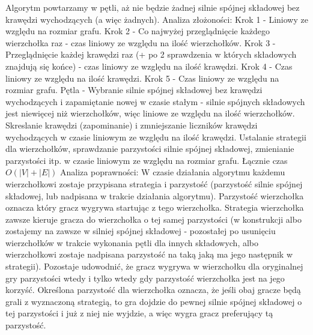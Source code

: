 \documentclass{article}
\begin{document}
Algorytm powtarzamy w pętli, aż nie będzie żadnej silnie spójnej składowej bez krawędzi wychodzących (a więc żadnych).\newline
\newline
Analiza złożoności:\newline
Krok 1 - Liniowy ze względu na rozmiar grafu.\newline
Krok 2 - Co najwyżej przeglądnięcie każdego wierzchołka raz - czas liniowy ze względu na ilość wierzchołków.\newline
Krok 3 - Przeglądnięcie każdej krawędzi raz (+ po 2 sprawdzenia w których składowych znajdują się końce) -
czas liniowy ze względu na ilość krawędzi.\newline
Krok 4 - Czas liniowy ze względu na ilość krawędzi.\newline
Krok 5 - Czas liniowy ze względu na rozmiar grafu.\newline
Pętla - Wybranie silnie spójnej składowej bez krawędzi wychodzących i zapamiętanie nowej w czasie stałym
- silnie spójnych składowych jest niewięcej niż wierzchołków, więc liniowe ze względu na ilość wierzchołków.
Skreslanie krawędzi (zapominanie) i zmniejszanie liczników krawędzi wychodzących w czasie liniowym ze względu na ilość krawędzi. 
Ustalanie strategii dla wierzchołków, sprawdzanie parzystości silnie spójnej składowej, zmienianie parzystości itp.
w czasie liniowym ze względu na rozmiar grafu.\newline
Łącznie czas $O(|V|+|E|)$\newline
\newline\newline
Analiza poprawności:\newline
W czasie działania algorytmu każdemu wierzchołkowi zostaje przypisana strategia i parzystość
(parzystość silnie spójnej składowej, lub nadpisana w trakcie działania algorytmu).
Parzystość wierzchołka oznacza który gracz wygrywa startując z tego wierzchołka.
Strategia wierzchołka zawsze kieruje gracza do wierzchołka o tej samej parzystości
(w konstrukcji albo zostajemy na zawsze w silniej spójnej składowej - pozostałej
po usunięciu wierzchołków w trakcie wykonania pętli dla innych składowych,
albo wierzchołkowi zostaje nadpisana parzystość na taką jaką ma jego następnik w strategii).
Pozostaje udowodnić, że gracz wygrywa w wierzchołku dla oryginalnej gry parzystości wtedy i
tylko wtedy gdy parzystość wierzchołka jest na jego korzyść.
Określona parzystość dla wierzchołka oznacza, że jeśli obaj gracze będą grali z wyznaczoną strategią,
to gra dojdzie do pewnej silnie spójnej składowej o tej parzystości i już z niej nie wyjdzie, a więc wygra gracz preferujący tą parzystość.
\end{document}
